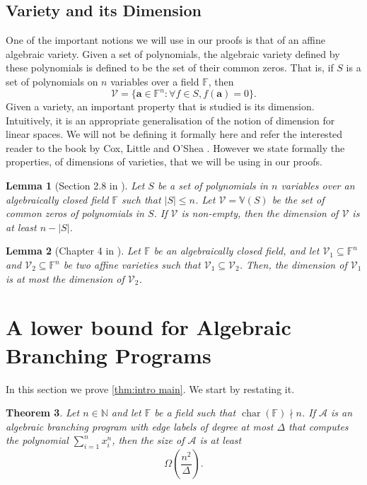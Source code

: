 \documentclass[10pt,a4paper]{article}
\newtheorem{theorem}{Theorem}
\newtheorem{lemma}[theorem]{Lemma}
\newcommand{\F}{\mathbb F}
\newcommand{\N}{\mathbb N}
\DeclareMathOperator{\Char}{char}
\newcommand{\inparen}[1]{\left(#1\right)}
\begin{document}
	
\subsection{Variety and its Dimension}
One of the important notions we will use in our proofs is that of an affine algebraic variety. Given a set of polynomials, the algebraic variety defined by these polynomials is defined to be the set of their common zeros. That is, if $S$ is a set of polynomials on $n$ variables over a field $\F$, then
\[\mathcal V=\{\mathbf a\in\F^n:\forall f\in S,f(\mathbf a)=0\}.\]
Given a variety, an important property that is studied is its dimension. Intuitively, it is an appropriate generalisation of the notion of dimension for linear spaces. We will not be defining it formally here and refer the interested reader to the book by Cox, Little and O'Shea \cite{CLO}. However we state formally the properties, of dimensions of varieties, that we will be using in our proofs.
\begin{lemma}[Section 2.8 in {\cite{smith2014introduction}}]\label{lem:dimlower}
Let $S$ be a set of polynomials in $n$ variables over an algebraically closed field $\F$ such that $|S|\le n$. Let $\mathcal V=\mathbb V(S)$ be the set of common zeros of polynomials in $S$. If $\mathcal V$ is non-empty, then the dimension of $\mathcal V$ is at least $n-|S|$.
\end{lemma}
\begin{lemma}[Chapter 4 in {\cite{CLO}}]\label{lem:diminclusion}
Let $\F$ be an algebraically closed field, and let $\mathcal V_1\subseteq\F^n$ and $\mathcal V_2\subseteq\F^n$ be two affine varieties such that $\mathcal V_1\subseteq\mathcal V_2$. Then, the dimension of $\mathcal V_1$ is at most the dimension of $\mathcal V_2$.
\end{lemma}

\section{A lower bound for Algebraic Branching Programs}	\label{sec:layered}
In this section we prove \autoref{thm:intro main}. We start by restating it.

\begin{theorem}\label{thm:main}
	Let $n \in \N$ and let $\F$ be a field such that $\Char(\F) \nmid n$.
	If $\mathcal{A}$ is an algebraic branching program with edge labels of degree at most $\Delta$ that computes the polynomial $\sum_{i=1}^{n} x_i^n$, then the size of $\mathcal{A}$ is at least
	\[
		\Omega \inparen{\frac{n^2}{\Delta}}.
	\]
\end{theorem}
	
\end{document}
